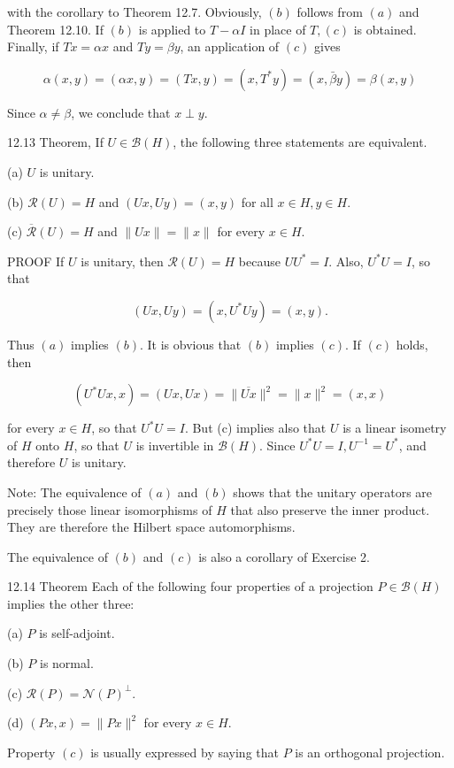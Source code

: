 \documentclass[10pt]{article}
\begin{document}
with the corollary to Theorem 12.7. Obviously, $(b)$ follows from $(a)$ and Theorem 12.10. If $(b)$ is applied to $T-\alpha I$ in place of $T,(c)$ is obtained. Finally, if $T x=\alpha x$ and $T y=\beta y$, an application of $(c)$ gives

$$
\alpha(x, y)=(\alpha x, y)=(T x, y)=\left(x, T^{*} y\right)=(x, \bar{\beta} y)=\beta(x, y)
$$

Since $\alpha \neq \beta$, we conclude that $x \perp y$.

12.13 Theorem, If $U \in \mathscr{B}(H)$, the following three statements are equivalent.

(a) $U$ is unitary.

(b) $\mathscr{R}(U)=H$ and $(U x, U y)=(x, y)$ for all $x \in H, y \in H$.

(c) $\overline{\mathscr{R}}(U)=H$ and $\|U x\|=\|x\|$ for every $x \in H$.

PROOF If $U$ is unitary, then $\mathscr{R}(U)=H$ because $U U^{*}=I$. Also, $U^{*} U=I$, so that

$$
(U x, U y)=\left(x, U^{*} U y\right)=(x, y) .
$$

Thus $(a)$ implies $(b)$. It is obvious that $(b)$ implies $(c)$. If $(c)$ holds, then

$$
\left(U^{*} U x, x\right)=(U x, U x)=\|\overline{U x}\|^{2}=\|x\|^{2}=(x, x)
$$

for every $x \in H$, so that $U^{*} U=I$. But (c) implies also that $U$ is a linear isometry of $H$ onto $H$, so that $U$ is invertible in $\mathscr{B}(H)$. Since $U^{*} U=I, U^{-1}=U^{*}$, and therefore $U$ is unitary.

Note: The equivalence of $(a)$ and $(b)$ shows that the unitary operators are precisely those linear isomorphisms of $H$ that also preserve the inner product. They are therefore the Hilbert space automorphisms.

The equivalence of $(b)$ and $(c)$ is also a corollary of Exercise 2.

12.14 Theorem Each of the following four properties of a projection $P \in \mathscr{B}(H)$ implies the other three:

(a) $P$ is self-adjoint.

(b) $P$ is normal.

(c) $\mathscr{R}(P)=\mathscr{N}(P)^{\perp}$.

(d) $(P x, x)=\|P x\|^{2}$ for every $x \in H$.

Property $(c)$ is usually expressed by saying that $P$ is an orthogonal projection.
\end{document}
